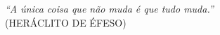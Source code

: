 \begin{epigrafe}
    \vspace*{\fill}
	\begin{flushright}
		\textit{``A única coisa que não muda é que tudo muda.''} \\
		(HERÁCLITO DE ÉFESO)
	\end{flushright}
\end{epigrafe}


